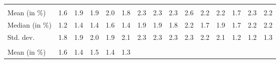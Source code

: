 \begin{tabular}{lllllllllllllll}
  \multicolumn{1}{r}{} &
  \multicolumn{1}{r}{} &
  \multicolumn{1}{r}{} &
  \multicolumn{1}{r}{} &
  \multicolumn{1}{r}{} &
  \multicolumn{1}{r}{} &
  \multicolumn{1}{r}{} &
  \multicolumn{1}{r}{} &
  \multicolumn{1}{r}{} &
  \multicolumn{1}{r}{} \\
\multicolumn{1}{l}{\hspace{2em}Mean (in $\%$)} &
  \multicolumn{1}{|r}{1.6} &
  \multicolumn{1}{r}{1.9} &
  \multicolumn{1}{r}{1.9} &
  \multicolumn{1}{r}{2.0} &
  \multicolumn{1}{r}{1.8} &
  \multicolumn{1}{r}{2.3} &
  \multicolumn{1}{r}{2.3} &
  \multicolumn{1}{r}{2.3} &
  \multicolumn{1}{r}{2.6} &
  \multicolumn{1}{r}{2.2} &
  \multicolumn{1}{r}{2.2} &
  \multicolumn{1}{r}{1.7} &
  \multicolumn{1}{r}{2.3} &
  \multicolumn{1}{r}{2.2} \\
\multicolumn{1}{l}{\hspace{2em}Median (in $\%$)} &
  \multicolumn{1}{|r}{1.2} &
  \multicolumn{1}{r}{1.4} &
  \multicolumn{1}{r}{1.4} &
  \multicolumn{1}{r}{1.6} &
  \multicolumn{1}{r}{1.4} &
  \multicolumn{1}{r}{1.9} &
  \multicolumn{1}{r}{1.9} &
  \multicolumn{1}{r}{1.8} &
  \multicolumn{1}{r}{2.2} &
  \multicolumn{1}{r}{1.7} &
  \multicolumn{1}{r}{1.9} &
  \multicolumn{1}{r}{1.7} &
  \multicolumn{1}{r}{2.2} &
  \multicolumn{1}{r}{2.2} \\
\multicolumn{1}{l}{\hspace{2em}Std. dev.} &
  \multicolumn{1}{|r}{1.8} &
  \multicolumn{1}{r}{1.9} &
  \multicolumn{1}{r}{2.0} &
  \multicolumn{1}{r}{1.9} &
  \multicolumn{1}{r}{2.1} &
  \multicolumn{1}{r}{2.3} &
  \multicolumn{1}{r}{2.3} &
  \multicolumn{1}{r}{2.3} &
  \multicolumn{1}{r}{2.3} &
  \multicolumn{1}{r}{2.2} &
  \multicolumn{1}{r}{2.1} &
  \multicolumn{1}{r}{1.2} &
  \multicolumn{1}{r}{1.2} &
  \multicolumn{1}{r}{1.3} \\
\multicolumn{1}{l}{\hspace{1em}{\textit{Additive term} ($\widehat{t}/\widetilde{p}$)}} &
  \multicolumn{1}{|r}{} &
  \multicolumn{1}{r}{} &
  \multicolumn{1}{r}{} &
  \multicolumn{1}{r}{} &
  \multicolumn{1}{r}{} &
  \multicolumn{1}{r}{} &
  \multicolumn{1}{r}{} &
  \multicolumn{1}{r}{} &
  \multicolumn{1}{r}{} &
  \multicolumn{1}{r}{} &
  \multicolumn{1}{r}{} &
  \multicolumn{1}{r}{} &
  \multicolumn{1}{r}{} &
  \multicolumn{1}{r}{} \\
\multicolumn{1}{l}{\hspace{2em}Mean (in $\%$)} &
  \multicolumn{1}{|r}{1.6} &
  \multicolumn{1}{r}{1.4} &
  \multicolumn{1}{r}{1.5} &
  \multicolumn{1}{r}{1.4} &
  \multicolumn{1}{r}{1.3} &

\end{tabular}
